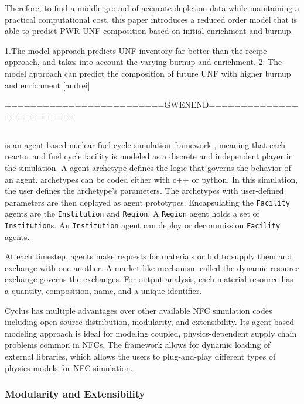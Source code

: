 Therefore, to find a middle ground of accurate depletion data while 
maintaining a practical computational cost, this paper introduces 
a reduced order model that is able to predict \gls{PWR} \gls{UNF}
composition based on initial enrichment and burnup. 


1.The model approach predicts \gls{UNF} inventory far better than
the recipe approach, and takes into account the varying burnup and
enrichment.
2. The model approach can predict the composition of future
\gls{UNF} with higher burnup and enrichment [andrei]

=========================GWENEND=========================

\subsection{\Cyclus}

\Cyclus is an agent-based nuclear fuel cycle simulation framework 
\cite{huff_fundamental_2016}, meaning
that each reactor and fuel cycle facility is modeled as a discrete and independent
player in the simulation.
A \Cyclus agent archetype defines the logic that governs the behavior
of an agent. 
\Cyclus archetypes can be coded either with c++ or python.
In this simulation, the user defines the archetype's
parameters. The archetypes with user-defined parameters are then deployed
as agent prototypes.  Encapsulating the \texttt{Facility} agents are the \texttt{Institution} and \texttt{Region}.
A \texttt{Region} agent holds a set of \texttt{Institution}s. 
An \texttt{Institution} agent can deploy or decommission \texttt{Facility} agents.

At each timestep,
agents make requests for materials or bid to supply them and exchange
with one another. A market-like mechanism called the dynamic resource exchange
\cite{gidden_methodology_2016} governs the exchanges.
For output analysis, each material resource has a quantity, composition, name, and a unique identifier.

Cyclus has multiple advantages over other available
\gls{NFC} simulation codes including open-source distribution, modularity,
and extensibility. Its agent-based modeling approach
is ideal for modeling coupled, physics-dependent
supply chain problems common in \glspl{NFC}.
The framework allows for dynamic loading of 
external libraries, which allows the users to plug-and-play
different types of physics models for \gls{NFC}
simulation.


\subsubsection{Modularity and Extensibility}


